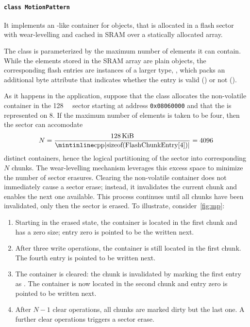 \paragraph{\texttt{class MotionPattern}}

It implements an -like container for  objects, that is allocated in a flash sector with wear-levelling and cached in SRAM over a statically allocated array.

The class is parameterized by the maximum number of elements it can contain.
While the elements stored in the SRAM array are plain  objects, the corresponding flash entries are instances of a larger type, , which packs an additional byte attribute that indicates whether the entry is valid () or not ().

As it happens in the application, suppose that the class allocates the non-volatile container in the \qty{128}{\kibi\byte} sector starting at address \texttt{0x08060000} and that the  is represented on \qty{8}{\byte}. If the maximum number of elements is taken to be four, then the sector can accomodate
\[
    N = \frac{\qty{128}{\kibi\byte}}{\text{\icpp{sizeof(FlashChunkEntry[4])}}} = 4096
\]
distinct containers, hence the logical partitioning of the sector into corresponding $N$ chunks. The wear-levelling mechanism leverages this excess space to minimize the number of sector erasures. Clearing the non-volatile container does not immediately cause a sector erase; instead, it invalidates the current chunk and enables the next one available. This process continues until all chunks have been invalidated, only then the sector is erased. To illustrate, consider~\cref{fig:mp}:
\begin{enumerate}[label=\textbf{(\alph*)}]
    \item Starting in the erased state, the container is located in the first chunk and has a zero size; entry zero is pointed to be the written next.
    \item After three write operations, the container is still located in the first chunk. The fourth entry is pointed to be written next.
    \item The container is cleared: the chunk is invalidated by marking the first entry as . The container is now located in the second chunk and entry zero is pointed to be written next.
    \item After $N-1$ clear operations, all chunks are marked dirty but the last one. A further clear operations triggers a sector erase.
\end{enumerate}

